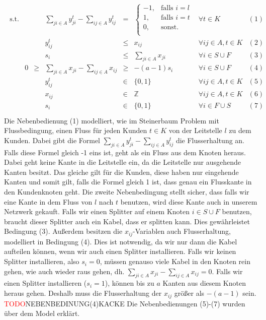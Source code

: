 \documentclass[11pt,a4paper]{article}
\newcommand{\Z}{\mathbb{Z}}
\newcommand{\TODO}{\textcolor{red}{TODO}}
\theoremstyle{my_th_style1}
\begin{document}
 \begin{align*}
 \begin{array}{rcrcrcll}
 \textrm{s.t.}  
&& &\displaystyle\sum_{ji \in A} y_{ji}^t - \displaystyle\sum_{ij \in A} y_{ij}^t& = & \left\{\begin{array}{cl} 
 -1, & \text{falls } i=l\\ 
 1, & \text{falls } i=t\\ 
 0, & \text{sonst.}\\ 
 \end{array}
 \right. & \forall t \in K & (1) \\
 &&& y_{ij}^t & \leq & x_{ij} & \forall ij \in A, t\in K & (2)\\
 &&& s_i &\leq& \displaystyle\sum_{ji \in A} x_{ji}& \forall  i \in S \cup F& (3)\\ 
 &0&\geq&\displaystyle\sum_{ji \in A} x_{ji} - \displaystyle\sum_{ij \in A} x_{ij}&\geq& -(a-1)s_i & \forall i \in S \cup F& (4)\\
 &&& y_{ij}^t & \in & \{0,1 \}& \forall ij \in A, t \in K & (5)\\
 &&& x_{ij} & \in & \Z & \forall ij \in A, t \in K & (6)\\
 &&& s_i & \in & \{ 0,1 \} & \forall i \in F \cup S & (7) \\
 \end{array}
 \end{align*}
 Die Nebenbedienung (1) modelliert, wie im Steinerbaum Problem mit Flussbedingung, einen Fluss für jeden Kunden $t \in K$ von der Leitstelle $l$ zu dem Kunden. Dabei gibt die Formel $\displaystyle\sum_{ji \in A} y_{ji}^t - \displaystyle\sum_{ij \in A} y_{ij}^t$ die Flusserhaltung an. Falls diese Formel gleich -1 eins ist, geht als ein Fluss aus dem Knoten heraus. Dabei geht keine Kante in die Leitstelle ein, da die Leitstelle nur ausgehende Kanten besitzt. Das gleiche gilt für die Kunden, diese haben nur eingehende Kanten und somit gilt, falls die Formel gleich 1 ist, dass genau ein Flusskante in den Kundenknoten geht. Die zweite Nebenbedingung stellt sicher, dass falls wir eine Kante in dem Fluss von $l$ nach $t$ benutzen, wird diese Kante auch in unserem Netzwerk gekauft. Falls wir einen Splitter auf einem Knoten $i \in S \cup F$ benutzen, braucht dieser Splitter auch ein Kabel, dass er splitten kann. Dies gewährleistet Bedingung (3). Außerdem besitzen die $x_{ij}$-Variablen auch Flusserhaltung, modelliert in Bedingung (4). Dies ist notwendig, da wir nur dann die Kabel aufteilen können, wenn wir auch einen Splitter installieren. Falls wir keinen Splitter installieren, also $s_i=0$, müssen genauso viele Kabel in den Knoten rein gehen, wie auch wieder raus gehen, dh. $\displaystyle\sum_{ji \in A} x_{ji} - \displaystyle\sum_{ij \in A} x_{ij}=0$. Falls wir einen Splitter installieren ($s_i=1$), können bis zu $a$ Kanten aus diesem Knoten heraus gehen. Deshalb muss die Flusserhaltung der $x_{ij}$ größer als $-(a-1)$ sein. \TODO NEBENBEDINUNG(4)KACKE
 Die Nebenbedienungen (5)-(7) wurden über dem Model erklärt.
  
\end{document}
